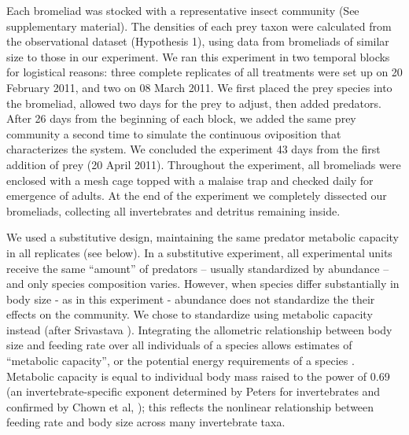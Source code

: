 \documentclass[11pt]{article}
\begin{document}
Each bromeliad was stocked with a representative insect community (See
supplementary material). The densities of each prey taxon were
calculated from the observational dataset (Hypothesis 1), using data
from bromeliads of similar size to those in our experiment. We ran this
experiment in two temporal blocks for logistical reasons: three complete
replicates of all treatments were set up on 20 February 2011, and two on
08 March 2011. We first placed the prey species into the bromeliad,
allowed two days for the prey to adjust, then added predators. After 26
days from the beginning of each block, we added the same prey community
a second time to simulate the continuous oviposition that characterizes
the system. We concluded the experiment 43 days from the first addition
of prey (20 April 2011). Throughout the experiment, all bromeliads were
enclosed with a mesh cage topped with a malaise trap and checked daily
for emergence of adults. At the end of the experiment we completely
dissected our bromeliads, collecting all invertebrates and detritus
remaining inside.

We used a substitutive design, maintaining the same predator metabolic
capacity in all replicates (see below). In a substitutive experiment,
all experimental units receive the same ``amount'' of predators --
usually standardized by abundance -- and only species composition
varies. However, when species differ substantially in body size - as in
this experiment - abundance does not standardize the their effects on
the community. We chose to standardize using metabolic capacity instead
(after Srivastava \citeyearpar{Srivastava2009a}). Integrating the
allometric relationship between body size and feeding rate
\citealt{Brown2004, Wilby2005} over all individuals of a species allows
estimates of ``metabolic capacity'', or the potential energy
requirements of a species \citealt{Srivastava2009a}. Metabolic capacity is
equal to individual body mass raised to the power of 0.69 (an
invertebrate-specific exponent determined by Peters
\citeyearpar{Peters1986} for invertebrates and confirmed by Chown et al,
\citeyearpar{Chown2007}); this reflects the nonlinear relationship
between feeding rate and body size across many invertebrate taxa.
\end{document}
